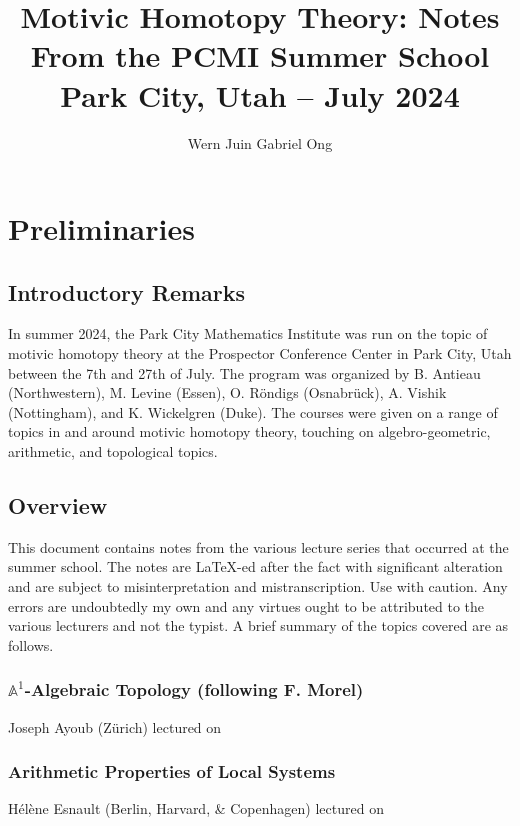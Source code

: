 \documentclass{amsart}
\theoremstyle{definition}
\numberwithin{equation}{section}
\begin{document}
\large
\title[Motivic Homotopy Theory -- Park City Mathematics Institute 2024]{Motivic Homotopy Theory: Notes From the PCMI Summer School \\ Park City, Utah -- July 2024}
\author{Wern Juin Gabriel Ong}
\address{Bowdoin College, Brunswick, Maine 04011}
\maketitle
\section*{Preliminaries}
\subsection*{Introductory Remarks} In summer 2024, the Park City Mathematics Institute was run on the topic of motivic homotopy theory at the Prospector Conference Center in Park City, Utah between the 7th and 27th of July. The program was organized by B. Antieau (Northwestern), M. Levine (Essen), O. R\"{o}ndigs (Osnabr\"{u}ck), A. Vishik (Nottingham), and K. Wickelgren (Duke). The courses were given on a range of topics in and around motivic homotopy theory, touching on algebro-geometric, arithmetic, and topological topics. 

\subsection*{Overview} This document contains notes from the various lecture series that occurred at the summer school. The notes are \LaTeX-ed after the fact with significant alteration and are subject to misinterpretation and mistranscription. Use with caution. Any errors are undoubtedly my own and any virtues ought to be attributed to the various lecturers and not the typist. A brief summary of the topics covered are as follows. 

\subsubsection*{$\mathbb{A}^{1}$-Algebraic Topology (following F. Morel)} Joseph Ayoub (Z\"{u}rich) lectured on 

\subsubsection*{Arithmetic Properties of Local Systems} H\'{e}l\`{e}ne Esnault (Berlin, Harvard, \& Copenhagen) lectured on 
\end{document}
